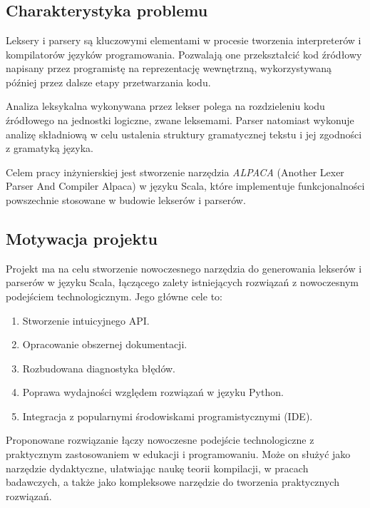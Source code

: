 \chapter{\chaptertitleprojectvision}
\label{ch:cel-wizja}


\section{Charakterystyka problemu}
\label{sec:charakterystyka-problemu}
Leksery i parsery są kluczowymi elementami w procesie tworzenia interpreterów i kompilatorów języków programowania.
Pozwalają one przekształcić kod źródłowy napisany przez programistę na reprezentację wewnętrzną, wykorzystywaną później przez dalsze etapy przetwarzania kodu.

Analiza leksykalna wykonywana przez lekser polega na rozdzieleniu kodu źródłowego na jednostki logiczne, zwane leksemami.
Parser natomiast wykonuje analizę składniową w celu ustalenia struktury gramatycznej tekstu i jej zgodności z gramatyką języka.

Celem pracy inżynierskiej jest stworzenie narzędzia \textit{ALPACA} (Another Lexer Parser And Compiler Alpaca) w języku Scala, które implementuje funkcjonalności powszechnie stosowane w budowie lekserów i parserów.


\section{Motywacja projektu}
\label{sec:motywacja-projektu}

Projekt ma na celu stworzenie nowoczesnego narzędzia do generowania lekserów i parserów w języku Scala, łączącego zalety istniejących rozwiązań z nowoczesnym podejściem technologicznym. Jego główne cele to:
\begin{enumerate}
    \item Stworzenie intuicyjnego API.
    \item Opracowanie obszernej dokumentacji.
    \item Rozbudowana diagnostyka błędów.
    \item Poprawa wydajności względem rozwiązań w języku Python.
    \item Integracja z popularnymi środowiskami programistycznymi (IDE).
\end{enumerate}

Proponowane rozwiązanie łączy nowoczesne podejście technologiczne z praktycznym zastosowaniem w edukacji i programowaniu.
Może on służyć jako narzędzie dydaktyczne, ułatwiając naukę teorii kompilacji, w pracach badawczych, a także jako kompleksowe narzędzie do tworzenia praktycznych rozwiązań.


